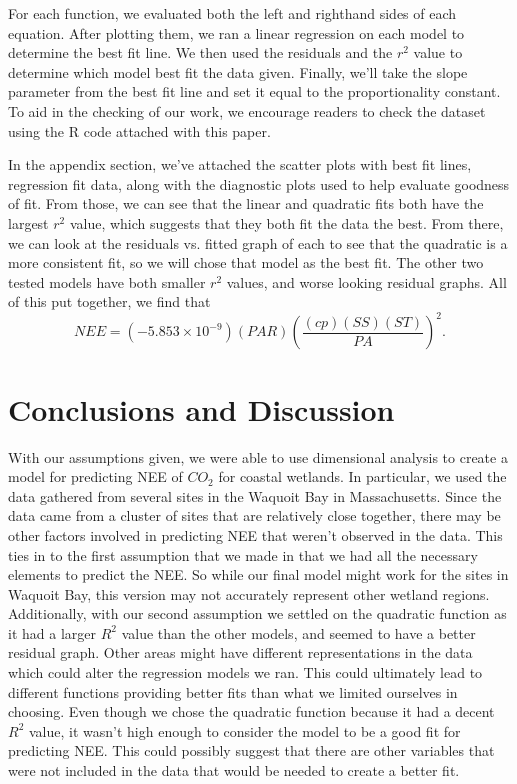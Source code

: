\documentclass{article}
\begin{document}
For each function, we evaluated both the left and righthand sides of each equation. After plotting them, we ran a linear regression on each model to determine the best fit line. We then used the residuals and the $r^2$ value to determine which model best fit the data given. Finally, we'll take the slope parameter from the best fit line and set it equal to the proportionality constant. To aid in the checking of our work, we encourage readers to check the dataset using the R code attached with this paper. \medskip

In the appendix section, we've attached the scatter plots with best fit lines, regression fit data, along with the diagnostic plots used to help evaluate goodness of fit. From those, we can see that the linear and quadratic fits both have the largest $r^2$ value, which suggests that they both fit the data the best. From there, we can look at the residuals vs. fitted graph of each to see that the quadratic is a more consistent fit, so we will chose that model as the best fit. The other two tested models have both smaller $r^2$ values, and worse looking residual graphs. All of this put together, we find that
$$NEE = \left(-5.853\times 10^{-9}\right)\left( PAR \right) \left(\frac{(cp)(SS)(ST)}{PA}\right)^2.$$

\section{Conclusions and Discussion}
With our assumptions given, we were able to use dimensional analysis to create a model for predicting NEE of $CO_2$ for coastal wetlands. In particular, we used the data gathered from several sites in the Waquoit Bay in Massachusetts. Since the data came from a cluster of sites that are relatively close together, there may be other factors involved in predicting NEE that weren't observed in the data. This ties in to the first assumption that we made in that we had all the necessary elements to predict the NEE. So while our final model might work for the sites in Waquoit Bay, this version may not accurately represent other wetland regions.\\

Additionally, with our second assumption we settled on the quadratic function as it had a larger $R^2$ value than the other models, and seemed to have a better residual graph. Other areas might have different representations in the data which could alter the regression models we ran. This could ultimately lead to different functions providing better fits than what we limited ourselves in choosing. Even though we chose the quadratic function because it had a decent $R^2$ value, it wasn't high enough to consider the model to be a good fit for predicting NEE. This could possibly suggest that there are other variables that were not included in the data that would be needed to create a better fit.\\ 
\end{document}

